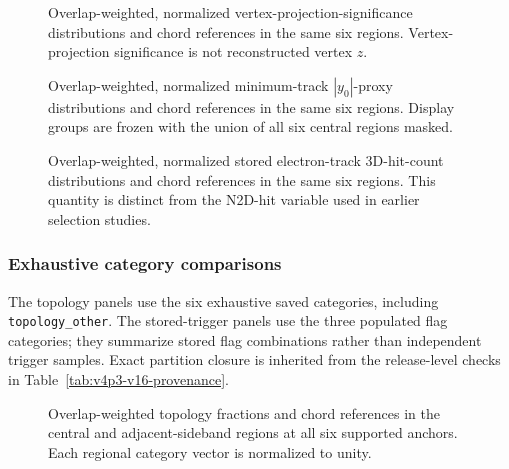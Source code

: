\begin{figure}[H]
\centering
{}
\caption{Overlap-weighted, normalized vertex-projection-significance
distributions and chord references in the same six regions.  Vertex-
projection significance is not reconstructed vertex $z$.}
\label{fig:v4p3-candidate-region-vtx-proj-sig}
\end{figure}

\begin{figure}[H]
\centering
{}
\caption{Overlap-weighted, normalized minimum-track $|y_0|$-proxy
distributions and chord references in the same six regions.  Display groups
are frozen with the union of all six central regions masked.}
\label{fig:v4p3-candidate-region-min-y0}
\end{figure}

\begin{figure}[H]
\centering
{}
\caption{Overlap-weighted, normalized stored electron-track 3D-hit-count
distributions and chord references in the same six regions.  This quantity is
distinct from the N2D-hit variable used in earlier selection studies.}
\label{fig:v4p3-candidate-region-electron-n3d-hits}
\end{figure}

\subsubsection{Exhaustive category comparisons}
\label{app:v4p3-candidate-region-categories}

The topology panels use the six exhaustive saved categories, including
\texttt{topology\_other}.  The stored-trigger panels use the three populated
flag categories; they summarize stored flag combinations rather than
independent trigger samples.  Exact partition closure is inherited from the
release-level checks in Table~\ref{tab:v4p3-v16-provenance}.

\begin{figure}[H]
\centering
{}
\caption{Overlap-weighted topology fractions and chord references in the
central and adjacent-sideband regions at all six supported anchors.  Each
regional category vector is normalized to unity.}
\label{fig:v4p3-candidate-region-topology}
\end{figure}

